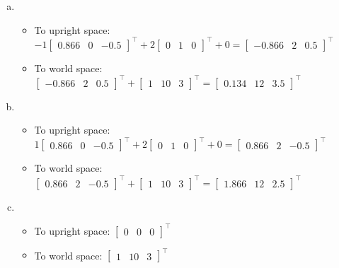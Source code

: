 \documentclass[11pt]{article}
\begin{document}
\begin{enumerate}[a.]
	\item %
	\begin{itemize}
		\item To upright space: $-1\begin{bmatrix}
			0.866 & 0 & -0.5
			\end{bmatrix}^\intercal
			+ 2\begin{bmatrix}
				0 & 1 & 0
			\end{bmatrix}^\intercal + 0 =\begin{bmatrix}
				-0.866 & 2 & 0.5
			\end{bmatrix}^\intercal$
		\item To world space: $\begin{bmatrix}
				-0.866 & 2 & 0.5
			\end{bmatrix}^\intercal
			+ \begin{bmatrix}
				1 & 10 & 3
			\end{bmatrix}^\intercal
			= \begin{bmatrix}
				0.134 & 12 & 3.5
			\end{bmatrix}^\intercal$
	\end{itemize}
	
	\item %
	\begin{itemize}
		\item To upright space: $1\begin{bmatrix}
			0.866 & 0 & -0.5
			\end{bmatrix}^\intercal
			+ 2\begin{bmatrix}
				0 & 1 & 0
			\end{bmatrix}^\intercal + 0 =\begin{bmatrix}
				0.866 & 2 & -0.5
			\end{bmatrix}^\intercal$
		\item To world space: $\begin{bmatrix}
				0.866 & 2 & -0.5
			\end{bmatrix}^\intercal
			+ \begin{bmatrix}
				1 & 10 & 3
			\end{bmatrix}^\intercal
			= \begin{bmatrix}
				1.866 & 12 & 2.5
			\end{bmatrix}^\intercal$
	\end{itemize}
	
	\item %
	\begin{itemize}
		\item To upright space: $\begin{bmatrix}
				0 & 0 & 0
			\end{bmatrix}^\intercal$
		\item To world space: $\begin{bmatrix}
				1 & 10 & 3
			\end{bmatrix}^\intercal$
	\end{itemize}
	

\end{enumerate}
\end{document}
